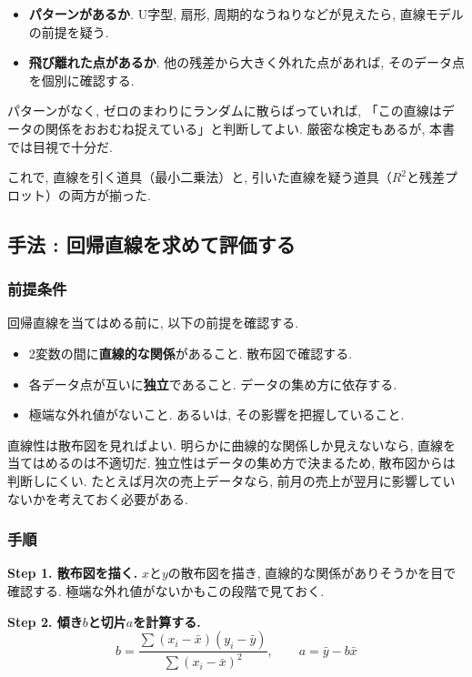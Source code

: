 \begin{itemize}
  \item \textbf{パターンがあるか}. U字型, 扇形, 周期的なうねりなどが見えたら, 直線モデルの前提を疑う.
  \item \textbf{飛び離れた点があるか}. 他の残差から大きく外れた点があれば, そのデータ点を個別に確認する.
\end{itemize}

パターンがなく, ゼロのまわりにランダムに散らばっていれば, 「この直線はデータの関係をおおむね捉えている」と判断してよい.
厳密な検定もあるが, 本書では目視で十分だ.

これで, 直線を引く道具（最小二乗法）と, 引いた直線を疑う道具（$R^2$と残差プロット）の両方が揃った.


\subsection{手法 : 回帰直線を求めて評価する}

\subsubsection*{前提条件}

回帰直線を当てはめる前に, 以下の前提を確認する.

\begin{itemize}
  \item 2変数の間に\textbf{直線的な関係}があること. 散布図で確認する.
  \item 各データ点が互いに\textbf{独立}であること. データの集め方に依存する.
  \item 極端な外れ値がないこと. あるいは, その影響を把握していること.
\end{itemize}

直線性は散布図を見ればよい.
明らかに曲線的な関係しか見えないなら, 直線を当てはめるのは不適切だ.
独立性はデータの集め方で決まるため, 散布図からは判断しにくい.
たとえば月次の売上データなら, 前月の売上が翌月に影響していないかを考えておく必要がある.

\subsubsection*{手順}

\textbf{Step 1. 散布図を描く.}
$x$と$y$の散布図を描き, 直線的な関係がありそうかを目で確認する.
極端な外れ値がないかもこの段階で見ておく.

\textbf{Step 2. 傾き$b$と切片$a$を計算する.}
\[
  b = \frac{\sum(x_i - \bar{x})(y_i - \bar{y})}{\sum(x_i - \bar{x})^2}, \qquad a = \bar{y} - b\bar{x}
\]

